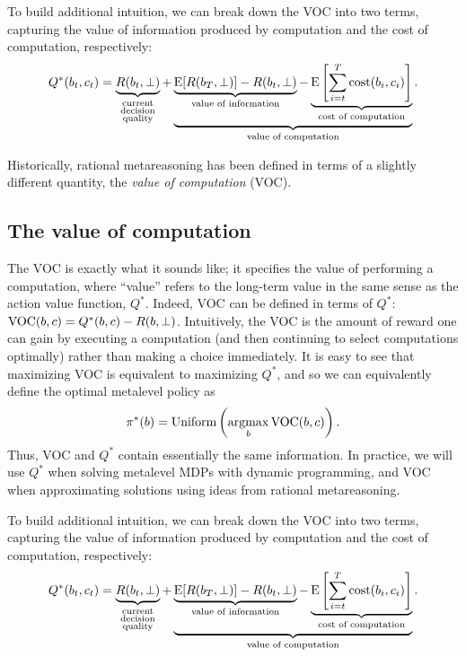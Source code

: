 To build additional intuition, we can break down the VOC into two terms, capturing the value of information produced by computation and the cost of computation, respectively:
%
\begin{equation}
  Q^*(b_t, c_t) = 
    \underbrace{R(b_t, \bot)
    }_{
      \substack{\text{current}\\ \text{decision}\\ \text{quality}}
    } +
    \underbrace{
      \underbrace{
        \operatorname*{E}[R(b_T, \bot)] - R(b_t, \bot)
      }_{
        \text{value of information}
      } - 
      \underbrace{
        \operatorname*{E}\left[\sum_{i=t}^T \text{cost}(b_i, c_i) \right]
      }_{
        \text{cost of computation}
      }
    }_{
      \text{value of computation}
    }.
\end{equation}
%



Historically, rational metareasoning \citep{russell1991principles} has been defined in terms of a slightly different quantity, the \emph{value of computation} (VOC). 

\subsection{The value of computation}
The VOC is exactly what it sounds like; it specifies the value of performing a computation, where ``value'' refers to the long-term value in the same sense as the action value function, $Q^*$. Indeed, VOC can be defined in terms of $Q^*$: $\text{VOC}(b, c) = Q^*(b, c) - R(b, \bot)$. Intuitively, the VOC is the amount of reward one can gain by executing a computation (and then continuing to select computations optimally) rather than making a choice immediately. It is easy to see that maximizing VOC is equivalent to maximizing $Q^*$, and so we can equivalently define the optimal metalevel policy as
%
\begin{equation}
  \pi^*(b) = \text{Uniform}\left(\operatorname*{argmax}_b \text{VOC}(b, c)\right).
\end{equation}
%
Thus, VOC and $Q^*$ contain essentially the same information. In practice, we will use $Q^*$ when solving metalevel MDPs with dynamic programming, and VOC when approximating solutions using ideas from rational metareasoning.

To build additional intuition, we can break down the VOC into two terms, capturing the value of information produced by computation and the cost of computation, respectively:
%
\begin{equation}
  Q^*(b_t, c_t) = 
    \underbrace{R(b_t, \bot)
    }_{
      \substack{\text{current}\\ \text{decision}\\ \text{quality}}
    } +
    \underbrace{
      \underbrace{
        \operatorname*{E}[R(b_T, \bot)] - R(b_t, \bot)
      }_{
        \text{value of information}
      } - 
      \underbrace{
        \operatorname*{E}\left[\sum_{i=t}^T \text{cost}(b_i, c_i) \right]
      }_{
        \text{cost of computation}
      }
    }_{
      \text{value of computation}
    }.
\end{equation}
%




